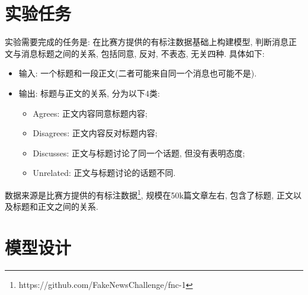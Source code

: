 \documentclass[a4paper]{article}
\begin{document}
	\section{实验任务}
	实验需要完成的任务是: 在比赛方提供的有标注数据基础上构建模型, 判断消息正文与消息标题之间的关系, 包括同意, 反对, 不表态, 无关四种. 具体如下:
	\begin{itemize}
		\item 输入: 一个标题和一段正文(二者可能来自同一个消息也可能不是).
		\item 输出: 标题与正文的关系, 分为以下4类:
		\begin{itemize}
			\item Agrees: 正文内容同意标题内容;
			\item Disagrees: 正文内容反对标题内容;
			\item Discusses: 正文与标题讨论了同一个话题, 但没有表明态度;
			\item Unrelated: 正文与标题讨论的话题不同.
		\end{itemize}
	\end{itemize}
	数据来源是比赛方提供的有标注数据\footnote{https://github.com/FakeNewsChallenge/fnc-1}, 规模在50k篇文章左右, 包含了标题, 正文以及标题和正文之间的关系.
	
	\section{模型设计}
\end{document}
